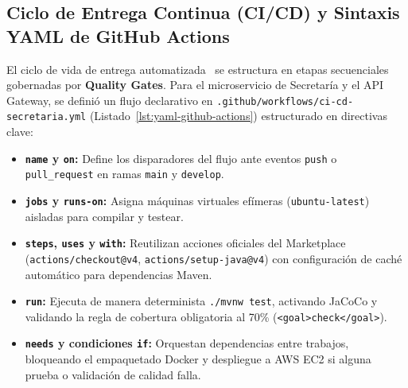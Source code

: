 \documentclass[11pt,a4paper]{article}
\begin{document}
\subsection{Ciclo de Entrega Continua (CI/CD) y Sintaxis YAML de GitHub Actions}
El ciclo de vida de entrega automatizada~\cite{humble2010continuous} se estructura en etapas secuenciales gobernadas por \textbf{Quality Gates}. Para el microservicio de Secretar\'ia y el API Gateway, se defini\'o un flujo declarativo en \texttt{.github/workflows/ci-cd-secretaria.yml} (Listado~\ref{lst:yaml-github-actions}) estructurado en directivas clave:
\begin{itemize}[noitemsep]
  \item \textbf{\texttt{name} y \texttt{on}:} Define los disparadores del flujo ante eventos \texttt{push} o \texttt{pull\_request} en ramas \texttt{main} y \texttt{develop}.
  \item \textbf{\texttt{jobs} y \texttt{runs-on}:} Asigna m\'aquinas virtuales ef\'imeras (\texttt{ubuntu-latest}) aisladas para compilar y testear.
  \item \textbf{\texttt{steps}, \texttt{uses} y \texttt{with}:} Reutilizan acciones oficiales del Marketplace (\texttt{actions/checkout@v4}, \texttt{actions/setup-java@v4}) con configuraci\'on de cach\'e autom\'atico para dependencias Maven.
  \item \textbf{\texttt{run}:} Ejecuta de manera determinista \texttt{./mvnw test}, activando JaCoCo y validando la regla de cobertura obligatoria al 70\% (\texttt{<goal>check</goal>}).
  \item \textbf{\texttt{needs} y condiciones \texttt{if}:} Orquestan dependencias entre trabajos, bloqueando el empaquetado Docker y despliegue a AWS EC2 si alguna prueba o validaci\'on de calidad falla.
\end{itemize}
\end{document}
